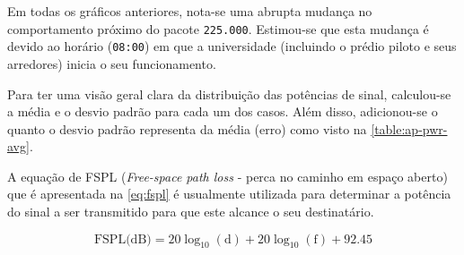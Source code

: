 Em todas os gráficos anteriores, nota-se uma abrupta mudança no comportamento
próximo do pacote \texttt{225.000}. Estimou-se que esta mudança é devido ao
horário (\texttt{08:00}) em que a universidade (incluindo o prédio piloto e seus
arredores) inicia o seu funcionamento.

Para ter uma visão geral clara da distribuição das potências de sinal,
calculou-se a média e o desvio padrão para cada um dos casos. Além disso,
adicionou-se o quanto o desvio padrão representa da média (erro) como visto na
\autoref{table:ap-pwr-avg}.

\begin{table}[htb]
\end{table}


A equação de FSPL (\emph{Free-space path loss} - perca no caminho em espaço
aberto) que é apresentada na \autoref{eq:fspl} é usualmente utilizada para
determinar a potência do sinal a ser transmitido para que este alcance o seu
destinatário.

\begin{equation}
	{\mbox{FSPL(dB)}}=20\log _{{10}}(\text{d})+20\log _{{10}}(\text{f})+92.45 \label{eq:fspl}
\end{equation}

